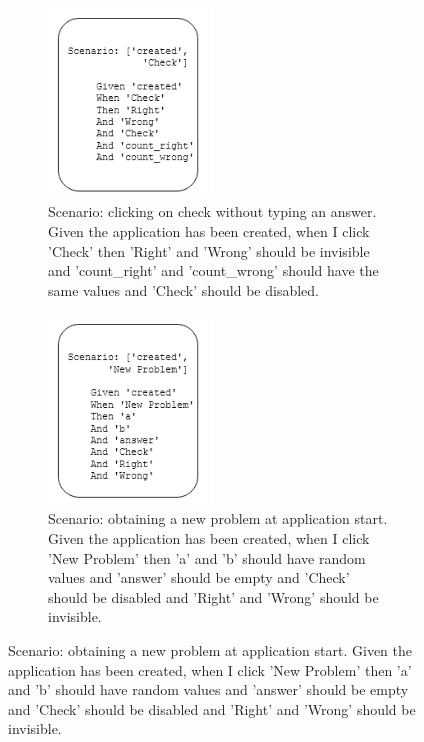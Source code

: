 \begin{figure}[H]
\begin{subfigure}[t]{0.48\textwidth}
        \includegraphics[width=0.48\textwidth]{images/scenarios_3.png}
        \caption{Scenario: clicking on check without typing an answer. Given the application has been created, when I click 'Check' then 'Right' and 'Wrong' should be invisible and 'count\_right' and 'count\_wrong' should have the same values and 'Check' should be disabled. }
   \end{subfigure}\hfill%
   \begin{subfigure}[t]{0.48\textwidth}
    \centering
    \includegraphics[width=0.48\textwidth]{images/scenarios_4.png}
    \caption{Scenario: obtaining a new problem at application start. Given the application has been created, when I click 'New Problem' then 'a' and 'b' should have random values and 'answer' should be empty and 'Check' should be disabled and 'Right' and 'Wrong' should be invisible.}
\end{subfigure}\hfill%
\end{figure}

